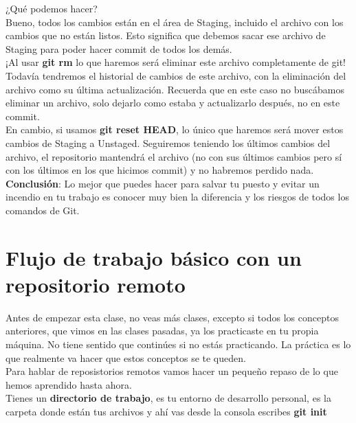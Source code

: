 \documentclass{article}
\begin{document}
¿Qué podemos hacer?\\

Bueno, todos los cambios están en el área de Staging, incluido el archivo con
los cambios que no están listos. Esto significa que debemos sacar ese archivo
de Staging para poder hacer commit de todos los demás.\\

¡Al usar \textbf{git rm} lo que haremos será eliminar este archivo
completamente de git! Todavía tendremos el historial de cambios de este
archivo, con la eliminación del archivo como su última actualización. Recuerda
que en este caso no buscábamos eliminar un archivo, solo dejarlo como estaba y
actualizarlo después, no en este commit.\\

En cambio, si usamos \textbf{git reset HEAD}, lo único que haremos será mover
estos cambios de Staging a Unstaged. Seguiremos teniendo los últimos cambios
del archivo, el repositorio mantendrá el archivo (no con sus últimos cambios
pero sí con los últimos en los que hicimos commit) y no habremos perdido
nada.\\

\textbf{Conclusión}: Lo mejor que puedes hacer para salvar tu puesto y evitar
un incendio en tu trabajo es conocer muy bien la diferencia y los riesgos de
todos los comandos de Git.

\newpage

\section{Flujo de trabajo básico con un repositorio remoto}%
Antes de empezar esta clase, no veas más clases, excepto si todos los conceptos
anteriores, que vimos en las clases pasadas, ya los practicaste en tu propia
máquina. No tiene sentido que continúes si no estás practicando. La práctica es
lo que realmente va hacer que estos conceptos se te queden.\\

Para hablar de reposistorios remotos vamos hacer un pequeño repaso de lo que
hemos aprendido hasta ahora.\\

Tienes un \textbf{directorio de trabajo}, es tu entorno de desarrollo personal,
es la carpeta donde están tus archivos y ahí vas desde la consola escribes
\textbf{git init}
\end{document}
